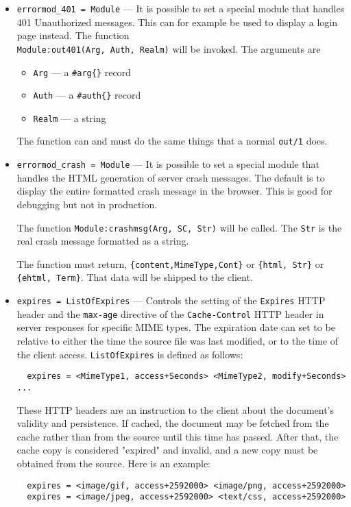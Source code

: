 \documentclass[11pt,oneside,english]{book}
\begin{document}
\begin{itemize}
\item       \verb+errormod_401 = Module+ ---
              It is possible to set a special module that handles 401
              Unauthorized messages. This can for example be used to display a
              login page instead. The function \\
              \verb+Module:out401(Arg, Auth, Realm)+ will be invoked. The
              arguments are
              \begin{itemize}
              \item \verb+Arg+ --- a \verb+#arg{}+ record
              \item \verb+Auth+ --- a \verb+#auth{}+ record
              \item \verb+Realm+ --- a string
              \end{itemize}
              The function can and must do the same things that a normal
              \verb+out/1+ does.

\item       \verb+errormod_crash = Module+ ---
              It is possible to set a special module that handles the HTML
              generation of server crash messages. The default is to display the
              entire formatted crash message in the browser. This is good for
              debugging but not in production.

              The function \verb+Module:crashmsg(Arg, SC, Str)+ will be
              called. The \verb+Str+ is the real crash message formatted as a
              string.

              The function must return, \verb+{content,MimeType,Cont}+ or
              \verb+{html, Str}+ or \verb+{ehtml, Term}+. That data will be
              shipped to the client.

\item       \verb+expires = ListOfExpires+ ---
              Controls the setting of the \verb+Expires+ HTTP header and the
              \verb+max-age+ directive of the \verb+Cache-Control+ HTTP header
              in server responses for specific MIME types. The expiration date
              can set to be relative to either the time the source file was last
              modified, or to the time of the client
              access. \verb+ListOfExpires+ is defined as follows:
\begin{verbatim}
  expires = <MimeType1, access+Seconds> <MimeType2, modify+Seconds> ...
\end{verbatim}
              These HTTP headers are an instruction to the client about the
              document's validity and persistence. If cached, the document may
              be fetched from the cache rather than from the source until this
              time has passed. After that, the cache copy is considered
              "expired" and invalid, and a new copy must be obtained from the
              source.
              Here is an example:
\begin{verbatim}
  expires = <image/gif, access+2592000> <image/png, access+2592000>
  expires = <image/jpeg, access+2592000> <text/css, access+2592000>
\end{verbatim}


\end{itemize}
\end{document}

